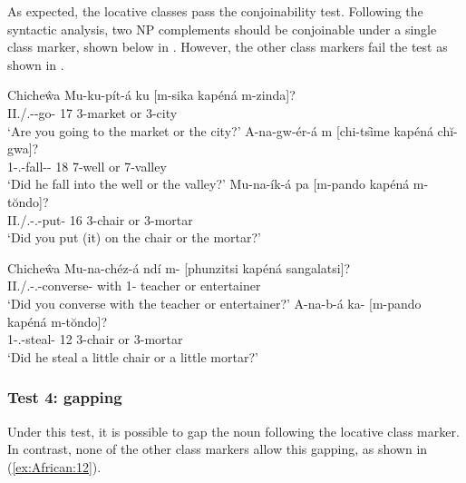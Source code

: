 \documentclass[output=paper,hidelinks]{langscibook}
\begin{document}
As expected, the locative classes pass the conjoinability test. Following the syntactic analysis, two NP complements should be conjoinable under a single class marker, shown below in . However, the other class markers fail the test as shown in .
\newpage

\ea\label{ex:African:10} Chiche\^wa
\ea
    \gll Mu-ku-pít-á ku [m-sika kapéná m-zinda]?\\
        II.{\PL}/.{\SBJ}-{\PROG}-go-{\IND}    17             3-market or         3-city \\
    \glt ‘Are you going to the market or the city?’
\ex
    \gll A-na-gw-ér-á m [chi-tsȋme kapéná chĭ-gwa]?\\
        1{\SBJ}-{.\PST}-fall-{}-{\IND}     18    7-well       or           7-valley\\
    \glt ‘Did he fall into the well or the valley?’
\ex
    \gll Mu-na-ík-á pa [m-pando kapéná m-tŏndo]?\\
        II.{\PL}/.{\SBJ}-{.\PST}-put-{\IND}  16       3-chair      or          3-mortar\\
    \glt ‘Did you put (it) on the chair or the mortar?’
\z
\z

         
\ea\label{ex:African:11} Chiche\^wa
\ea
     \gll  *Mu-na-chéz-á ndí m- [phunzitsi kapéná sangalatsi]?\\
     II.{\PL}/.{\SBJ}-{.\PST}-converse-{\IND}    with 1- teacher      or         entertainer\\
     \glt ‘Did you converse with the teacher or entertainer?’
\ex
     \gll *A-na-b-á ka- [m-pando kapéná m-tŏndo]?\\
           1{\SBJ}-{.\PST}-steal-{\IND} 12   3-chair      or          3-mortar\\
      \glt ‘Did he steal a little chair or a little mortar?’
\z
\z
      
\subsubsection{Test 4: gapping}

Under this test, it is possible to gap the noun following the locative class marker. In contrast, none of the other class markers allow this gapping, as shown in (\ref{ex:African:12}).
\end{document}
